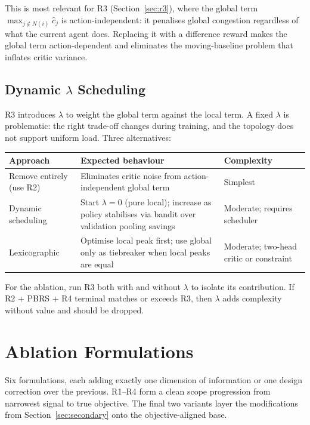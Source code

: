 \documentclass[11pt]{article}
\begin{document}
This is most relevant for R3 (Section~\ref{sec:r3}), where the global
term $\max_{j \notin N(i)} \hat{c}_j$ is action-independent: it penalises
global congestion regardless of what the current agent does.  Replacing it
with a difference reward makes the global term action-dependent and
eliminates the moving-baseline problem that inflates critic variance.

\subsection{Dynamic $\lambda$ Scheduling}
\label{sec:lambda}

R3 introduces $\lambda$ to weight the global term against the local term.
A fixed $\lambda$ is problematic: the right trade-off changes during
training, and the topology does not support uniform load.  Three
alternatives:

\begin{center}
\small
\renewcommand{\arraystretch}{1.3}
\begin{tabular}{p{3.5cm}p{4.5cm}p{4.5cm}}
\toprule
\textbf{Approach} & \textbf{Expected behaviour} & \textbf{Complexity} \\
\midrule
Remove entirely (use R2) &
  Eliminates critic noise from action-independent global term &
  Simplest \\
Dynamic scheduling &
  Start $\lambda = 0$ (pure local); increase as policy stabilises
  via bandit over validation pooling savings &
  Moderate; requires scheduler \\
Lexicographic &
  Optimise local peak first; use global only as tiebreaker when
  local peaks are equal &
  Moderate; two-head critic or constraint \\
\bottomrule
\end{tabular}
\end{center}

\noindent
For the ablation, run R3 both with and without $\lambda$ to isolate its
contribution.  If R2 + PBRS + R4 terminal matches or exceeds R3, then
$\lambda$ adds complexity without value and should be dropped.

\section{Ablation Formulations}
\label{sec:ablation}

Six formulations, each adding exactly one dimension of information or one
design correction over the previous.  R1--R4 form a clean scope
progression from narrowest signal to true objective.  The final two
variants layer the modifications from Section~\ref{sec:secondary} onto
the objective-aligned base.
\end{document}

